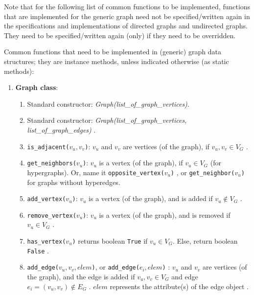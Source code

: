 Note that for the following list of common functions to be implemented, functions that are implemented for the generic graph need not be specified/written again in the specifications and implementations of directed graphs and undirected graphs. They need to be specified/written again (only) if they need to be overridden.
 


Common functions that need to be implemented in (generic) graph data structures; they are instance methods, unless indicated otherwise (as static methods):
\begin{enumerate}
\item {\bf Graph class}: \vspace{-0.3cm}
	\begin{enumerate} \itemsep -2pt
	\item Standard constructor: {\it Graph(list\_of\_graph\_vertices)}. %
	\item Standard constructor: {\it Graph(list\_of\_graph\_vertices, list\_of\_graph\_edges)} \cite[\S52.4, pp. 849; \S52.5, pp. 850]{Goldman2008}.
	\item {\tt is\_adjacent($v_{u}, v_{v}$)}: $v_{u}$ and $v_{v}$ are vertices (of the graph), if $v_{u}, v_{v} \in V_{G}$ \cite{WikipediaContributors2018a49} \cite[\S13.1.1, pp. 599]{Goodrich2011}.
	\item {\tt get\_neighbors($v_{u}$)}: $v_{u}$ is a vertex (of the graph), if $v_{u} \in V_{G}$ \cite{WikipediaContributors2018a49} (for hypergraphs). Or, name it {\tt opposite\_vertex($v_{u}$)} \cite[\S13.1.1, pp. 599]{Goodrich2011}, or {\tt get\_neighbor($v_{u}$)} for graphs without hyperedges.
	\item {\tt add\_vertex($v_{u}$)}: $v_{u}$ is a vertex (of the graph), and is added if $v_{u} \not\in V_{G}$ \cite{WikipediaContributors2018a49} \cite[\S14.1.1, pp. 626]{Goodrich2013} \cite[\S13.1.1, pp. 599]{Goodrich2011} \cite[\S52.4, pp. 849; \S52.5, pp. 850]{Goldman2008}.
	\item {\tt remove\_vertex($v_{u}$)}: $v_{u}$ is a vertex (of the graph), and is removed if $v_{u} \in V_{G}$  \cite{WikipediaContributors2018a49} \cite[\S14.1.1, pp. 626]{Goodrich2013} \cite[\S13.1.1, pp. 599]{Goodrich2011} \cite[\S52.4, pp. 849]{Goldman2008}.
	\item {\tt has\_vertex($v_{u}$)} returns boolean {\tt True} if $v_{u} \in V_{G}$. Else, return boolean {\tt False} \cite[\S52.4, pp. 849; \S52.5, pp. 850]{Goldman2008}.
	\item {\tt add\_edge($v_{u}, v_{v}, elem$)}, or {\tt add\_edge($e_{i}, elem$)} \cite[\S52.4, pp. 849; \S52.5, pp. 850]{Goldman2008}: $v_{u}$ and $v_{v}$ are vertices (of the graph), and the edge is added if $v_{u}, v_{v} \in V_{G}$ and edge $e_{i} = (v_{u}, v_{v}) \not\in E_{G}$ \cite{WikipediaContributors2018a49}. $elem$ represents the attribute(s) of the edge object \cite[\S14.1.1, pp. 626]{Goodrich2013} \cite[\S13.1.1, pp. 599]{Goodrich2011}.

\end{enumerate}
\end{enumerate}
